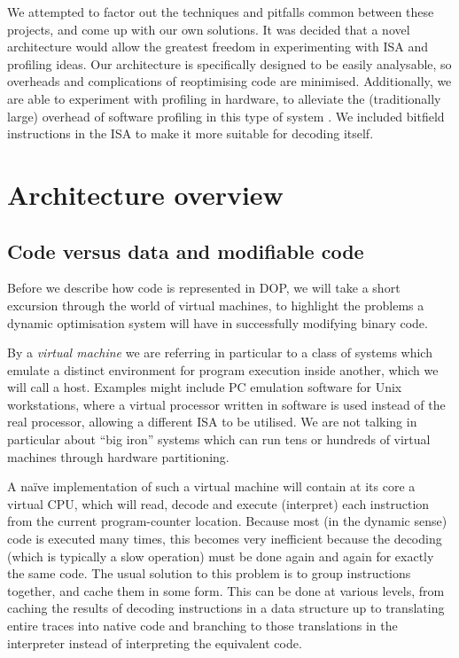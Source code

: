 \documentclass[11pt,letterpaper,twocolumn,notitlepage]{article}
\begin{document}
We attempted to factor out the techniques and pitfalls common between these projects, and come up with our own solutions. It was decided that a novel architecture would allow the greatest freedom in experimenting with ISA and profiling ideas. Our architecture is specifically designed to be easily analysable, so overheads and complications of reoptimising code are minimised. Additionally, we are able to experiment with profiling in hardware, to alleviate the (traditionally large) overhead of software profiling in this type of system \cite{Dynamo,Mojo}. We included bitfield instructions in the ISA to make it more suitable for decoding itself.

\section{Architecture overview}

\subsection{Code versus data and modifiable code}

Before we describe how code is represented in DOP, we will take a short excursion through the world of virtual machines, to highlight the problems a dynamic optimisation system will have in successfully modifying binary code.

By a {\em virtual machine} we are referring in particular to a class of systems which emulate a distinct environment for program execution inside another, which we will call a host. Examples might include PC emulation software for Unix workstations, where a virtual processor written in software is used instead of the real processor, allowing a different ISA to be utilised. We are not talking in particular about ``big iron'' systems which can run tens or hundreds of virtual machines through hardware partitioning.

A na\"ive implementation of such a virtual machine will contain at its core a virtual CPU, which will read, decode and execute (interpret) each instruction from the current program-counter location. Because most (in the dynamic sense) code is executed many times, this becomes very inefficient because the decoding (which is typically a slow operation) must be done again and again for exactly the same code. The usual solution to this problem is to group instructions together, and cache them in some form. This can be done at various levels, from caching the results of decoding instructions in a data structure up to translating entire traces into native code and branching to those translations in the interpreter instead of interpreting the equivalent code.
\end{document}
